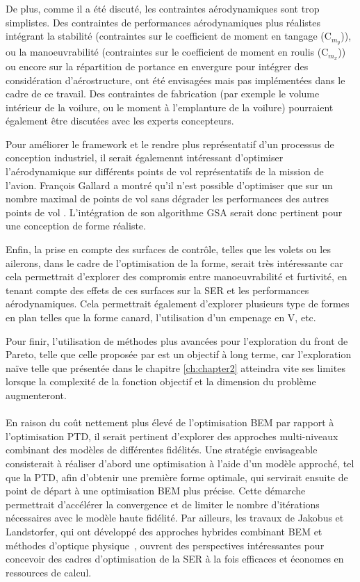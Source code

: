 De plus, comme il a été discuté, les contraintes aérodynamiques sont trop simplistes. Des contraintes de performances aérodynamiques plus réalistes intégrant la stabilité (contraintes sur le coefficient de moment en tangage ($\mathrm C_{m_y}$)), ou la manoeuvrabilité (contraintes sur le coefficient de moment en roulis ($\mathrm C_{m_x}$)) ou encore sur la répartition de portance en envergure pour intégrer des considération d'aérostructure, ont été envisagées mais pas implémentées dans le cadre de ce travail. Des contraintes de fabrication (par exemple le volume intérieur de la voilure, ou le moment à l'emplanture de la voilure) pourraient également être discutées avec les experts concepteurs.

Pour améliorer le framework et le rendre plus représentatif d'un processus de conception industriel, il serait égalemennt intéressant d'optimiser l'aérodynamique sur différents points de vol représentatifs de la mission de l'avion. François Gallard a montré qu'il n'est possible d'optimiser que sur un nombre maximal de points de vol sans dégrader les performances des autres points de vol \citep{Gallard2014}. L'intégration de son algorithme GSA serait donc pertinent pour une conception de forme réaliste.

Enfin, la prise en compte des surfaces de contrôle, telles que les volets ou les ailerons, dans le cadre de l'optimisation de la forme, serait très intéressante car cela permettrait d'explorer des compromis entre manoeuvrabilité et furtivité, en tenant compte des effets de ces surfaces sur la SER et les performances aérodynamiques. Cela permettrait également d'explorer plusieurs type de formes en plan telles que la forme canard, l'utilisation d'un empenage en V, etc.

Pour finir, l'utilisation de méthodes plus avancées pour l'exploration du front de Pareto, telle que celle proposée par \cite{Desideri2012} est un objectif à long terme, car l'exploration naïve telle que présentée dans le chapitre \ref{ch:chapter2} atteindra vite ses limites lorsque la complexité de la fonction objectif et la dimension du problème augmenteront.

\paragraph{}
En raison du coût nettement plus élevé de l'optimisation BEM par rapport à l'optimisation PTD, il serait pertinent d'explorer des approches multi-niveaux combinant des modèles de différentes fidélités. Une stratégie envisageable consisterait à réaliser d'abord une optimisation à l'aide d'un modèle approché, tel que la PTD, afin d'obtenir une première forme optimale, qui servirait ensuite de point de départ à une optimisation BEM plus précise. Cette démarche permettrait d'accélérer la convergence et de limiter le nombre d'itérations nécessaires avec le modèle haute fidélité. Par ailleurs, les travaux de Jakobus et Landstorfer, qui ont développé des approches hybrides combinant BEM et méthodes d'optique physique~\cite{Jakobus2002, Jakobus2002a}, ouvrent des perspectives intéressantes pour concevoir des cadres d'optimisation de la SER à la fois efficaces et économes en ressources de calcul.

